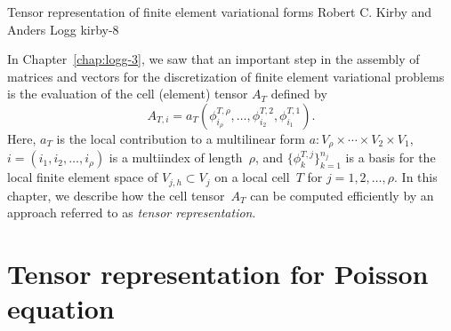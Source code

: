               {Tensor representation of finite element variational forms}
              {Robert C. Kirby and Anders Logg}
              {kirby-8}

In Chapter~\ref{chap:logg-3}, we saw that an important step in the
assembly of matrices and vectors for the discretization of finite
element variational problems is the evaluation of the cell (element)
tensor $A_T$ defined by
\begin{equation*}
  A_{T,i}
  = a_T(\phi^{T,\rho}_{i_{\rho}}, \ldots, \phi^{T,2}_{i_2}, \phi^{T,1}_{i_1}).
\end{equation*}
Here, $a_T$ is the local contribution to a multilinear form $a:
V_{\rho} \times \cdots \times V_2 \times V_1$,
$i=(i_1,i_2,\dots,i_\rho)$ is a multiindex of length~$\rho$, and
$\{\phi^{T,j}_k\}_{k=1}^{n_j}$ is a basis for the local finite element
space of $V_{j,h} \subset V_j$ on a local cell~$T$ for $j =
1,2,\ldots,\rho$. In this chapter, we describe how the cell
tensor~$A_T$ can be computed efficiently by an approach referred to as
\emph{tensor representation}.

\section{Tensor representation for Poisson equation}


